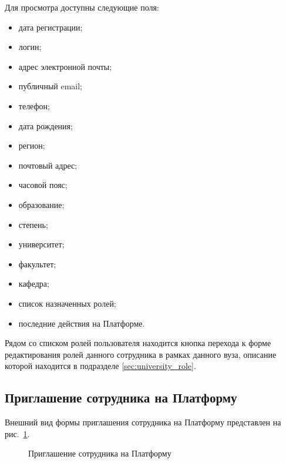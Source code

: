 Для просмотра доступны следующие поля:
\begin{itemize}
	\item дата регистрации;
	\item логин;
	\item адрес электронной почты;
	\item публичный email;
	\item телефон;
	\item дата рождения;
	\item регион;
	\item почтовый адрес;
	\item часовой пояс;
	\item образование;
	\item степень;
	\item университет;
	\item факультет;
	\item кафедра;
	\item список назначенных ролей;
	\item последние действия на Платформе.
\end{itemize}

Рядом со списком ролей пользователя находится кнопка перехода 
к форме редактирования ролей данного сотрудника в рамках данного вуза, 
описание которой находится в подразделе \ref{sec:university_role}.

\subsection{Приглашение сотрудника на Платформу}\label{sec:invite}

Внешний вид формы приглашения сотрудника на Платформу представлен на рис.~\ref{img:employee:invite}. 

\begin{figure}[H]
	\caption{Приглашение сотрудника на Платформу}
	\label{img:employee:invite}
\end{figure}

